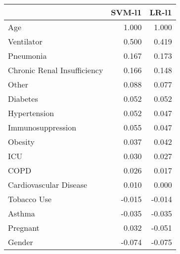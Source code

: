 \begin{tabular}{lrr}
\toprule
{} &  SVM-l1 &  LR-l1 \\
\midrule
Age                         &   1.000 &  1.000 \\
Ventilator                  &   0.500 &  0.419 \\
Pneumonia                   &   0.167 &  0.173 \\
Chronic Renal Insufficiency &   0.166 &  0.148 \\
Other                       &   0.088 &  0.077 \\
Diabetes                    &   0.052 &  0.052 \\
Hypertension                &   0.052 &  0.047 \\
Immunosuppression           &   0.055 &  0.047 \\
Obesity                     &   0.037 &  0.042 \\
ICU                         &   0.030 &  0.027 \\
COPD                        &   0.026 &  0.017 \\
Cardiovascular Disease      &   0.010 &  0.000 \\
Tobacco Use                 &  -0.015 & -0.014 \\
Asthma                      &  -0.035 & -0.035 \\
Pregnant                    &   0.032 & -0.051 \\
Gender                      &  -0.074 & -0.075 \\
\bottomrule
\end{tabular}
